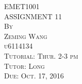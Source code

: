 \documentclass{article}
\begin{document}




\thispagestyle{empty}

\begin{center}
\huge
\vspace*{1.0in} EMET1001 
\\\vspace{0.5in} ASSIGNMENT 11
\normalsize
\\\vspace{0.5in} \textsc{By}
\\\vspace{0.1in} \textsc{Zeming Wang}
\\\vspace{0.1in} \textsc{u6114134}
\normalsize
\\\vspace{0.5in} \textsc{Tutorial: Thur. 2-3 pm}
\\\vspace{0.1in} \textsc{Tutor: Long}
\normalsize
\\\vspace{0.5in} \textsc{Due: Oct. 17, 2016}
\end{center}

\newpage
\setcounter{page}{1}
\end{document}
